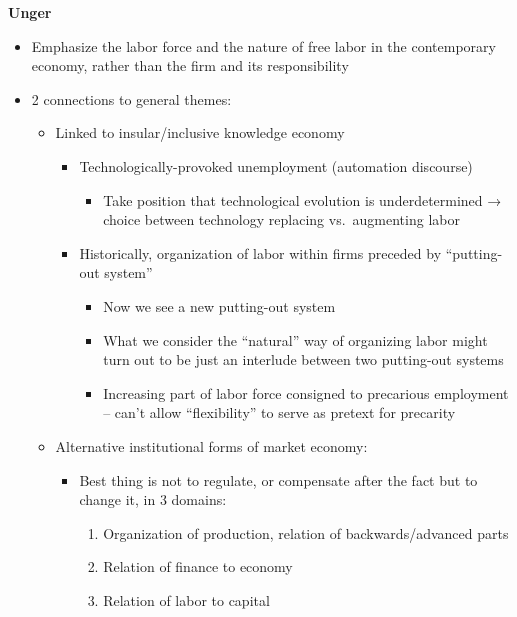 \textbf{Unger}

\begin{itemize}
\tightlist
\item
  Emphasize the labor force and the nature of free labor in the
  contemporary economy, rather than the firm and its responsibility
\item
  2 connections to general themes:

  \begin{itemize}
  \tightlist
  \item
    Linked to insular/inclusive knowledge economy

    \begin{itemize}
    \tightlist
    \item
      Technologically-provoked unemployment (automation discourse)

      \begin{itemize}
      \tightlist
      \item
        Take position that technological evolution is underdetermined →
        choice between technology replacing vs.~augmenting labor
      \end{itemize}
    \item
      Historically, organization of labor within firms preceded by
      ``putting-out system''

      \begin{itemize}
      \tightlist
      \item
        Now we see a new putting-out system
      \item
        What we consider the ``natural'' way of organizing labor might
        turn out to be just an interlude between two putting-out systems
      \item
        Increasing part of labor force consigned to precarious
        employment -- can't allow ``flexibility'' to serve as pretext
        for precarity
      \end{itemize}
    \end{itemize}
  \item
    Alternative institutional forms of market economy:

    \begin{itemize}
    \tightlist
    \item
      Best thing is not to regulate, or compensate after the fact but to
      change it, in 3 domains:

      \begin{enumerate}
      \def\labelenumi{\arabic{enumi}.}
      \tightlist
      \item
        Organization of production, relation of backwards/advanced parts
      \item
        Relation of finance to economy
      \item
        Relation of labor to capital
      \end{enumerate}
    \end{itemize}
  \end{itemize}
\end{itemize}

